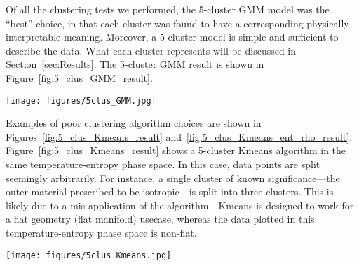 \documentclass[fleqn,usenatbib,useAMS]{mnras}
\begin{document}
Of all the clustering tests we performed, the 5-cluster GMM model was the ``best'' choice, in that each cluster was found to have a corresponding physically interpretable meaning. Moreover, a 5-cluster model is simple and sufficient to describe the data. What each cluster represents will be discussed in Section~\ref{sec:Results}. The 5-cluster GMM result is shown in Figure~\ref{fig:5_clus_GMM_result}. \par
%
\begin{figure*}
\centering
\texttt{[image: figures/5clus\_GMM.jpg]}
\caption{The results of the 5-cluster GMM algorithm of the 35,987 SPH particles remaining after pre-processing, for a maximum of 200 iterations in a scaled temperature-specific entropy phase space. The covariance type was set to `full', with weights initialized by `kmeans' with a random seeding. Each cluster is represented by a different color with the centroids marked by black circles.}
\label{fig:5_clus_GMM_result}
\end{figure*}
%
Examples of poor clustering algorithm choices are shown in Figures~\ref{fig:5_clus_Kmeans_result} and~\ref{fig:5_clus_Kmeans_ent_rho_result}. Figure~\ref{fig:5_clus_Kmeans_result} shows a 5-cluster Kmeans algorithm in the same temperature-entropy phase space. In this case, data points are split seemingly arbitrarily. For instance, a single cluster of known significance---the outer material prescribed to be isotropic---is split into three clusters. This is likely due to a mis-application of the algorithm---Kmeans is designed to work for a flat geometry (flat manifold) usecase, whereas the data plotted in this temperature-entropy phase space is non-flat. \par
%
\begin{figure*}
\centering
\texttt{[image: figures/5clus\_Kmeans.jpg]}
\caption{The results of a 5-cluster Kmeans algorithm, for a maximum of 300 iterations in a scaled temperature-entropy phase space. The weights were initialized by `k-means++' in \texttt{sklearn.cluster.KMeans}, with 50 runs set by different centroid seeding. Each cluster is represented by a different color with cluster centroids marked by black circles. After pre-processing, there are 35,987 SPH particles to be clustered, ran with the same random seed as in the GMM clustering algorithm, the results of which are shown in Figure~\ref{fig:5_clus_GMM_result}. This is an example of a poor clustering algorithm choice in this phase-space because it arbitrarily splits likely physical clusters (such as a singular isentropic structure) into multiple disparate clusters. Further, Kmeans is designed to be used on flat geometry, but in this phase-space the data is non-flat.}
\label{fig:5_clus_Kmeans_result}
\end{figure*}
\end{document}
